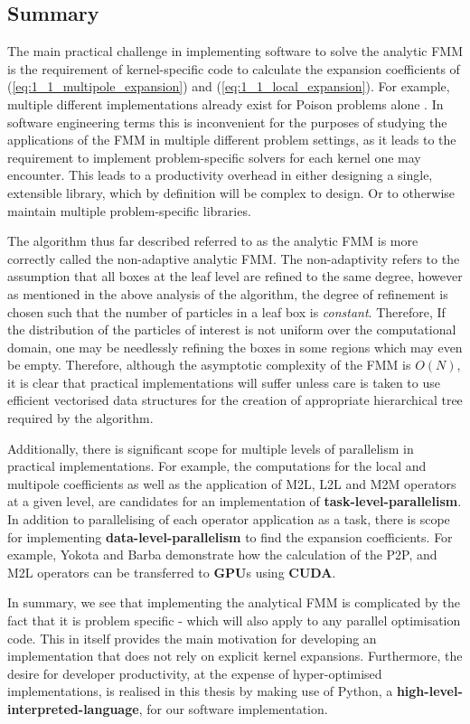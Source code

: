 \subsection{Summary}

The main practical challenge in implementing software to solve the analytic FMM
is the requirement of kernel-specific code to calculate the expansion coefficients of
(\ref{eq:1_1_multipole_expansion}) and (\ref{eq:1_1_local_expansion}). For example,
multiple different implementations already exist for Poison problems alone \cite{Greengard:1996:JCP, Etheridge:2001:SIAM}.
In software engineering terms this is inconvenient for the purposes of studying
the applications of the FMM in multiple different problem settings, as it leads to the requirement
to implement problem-specific solvers for each kernel one may encounter. This
leads to a productivity overhead in either designing a single, extensible
library, which by definition will be complex to design. Or to otherwise
maintain multiple problem-specific libraries.

The algorithm thus far described referred to as the analytic FMM is more correctly
called the non-adaptive analytic FMM. The non-adaptivity refers to the assumption that
all boxes at the leaf level are refined to the same degree, however as mentioned
in the above analysis of the algorithm, the degree of refinement is chosen such
that the number of particles in a leaf box is \textit{constant}. Therefore, If
the distribution of the particles of interest is not uniform over the computational
domain, one may be needlessly refining the boxes in some regions which may even be
empty. Therefore, although the asymptotic complexity of
the FMM is $O(N)$, it is clear that practical implementations will suffer unless
care is taken to use efficient vectorised data structures for the creation of
appropriate hierarchical tree required by the algorithm.

Additionally, there is significant scope for multiple levels of
parallelism in practical implementations. For example, the computations
for the local and multipole coefficients as well as the application of M2L, L2L
and M2M operators at a given level, are candidates for an implementation of
\textbf{\gls{task-level-parallelism}}. In addition to parallelising of each operator
application as a task, there is scope for implementing
\textbf{\gls{data-level-parallelism}} to find the expansion coefficients. For example,
Yokota and Barba \cite{Hwu:2011:MKP} demonstrate how the calculation of the P2P,
and M2L operators can be transferred to \textbf{\gls{GPU}}s using \textbf{\gls{CUDA}}.

In summary, we see that implementing the analytical FMM is complicated by the
fact that it is problem specific - which will also apply to any parallel
optimisation code. This in itself provides the main motivation for developing
an implementation that does not rely on explicit kernel expansions. Furthermore,
the desire for developer productivity, at the expense of hyper-optimised
implementations, is realised in this thesis by making use of Python,
a \textbf{\gls{high-level-interpreted-language}}, for our software implementation.
